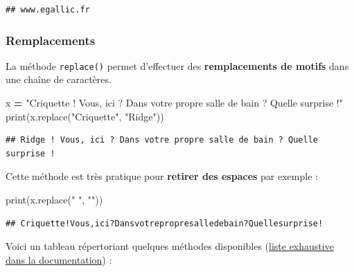 \documentclass[12pt,]{book}
\newenvironment{Shaded}{\begin{snugshade}}{\end{snugshade}}
\newcommand{\StringTok}[1]{\textcolor[rgb]{0.31,0.60,0.02}{#1}}
\newcommand{\OperatorTok}[1]{\textcolor[rgb]{0.81,0.36,0.00}{\textbf{#1}}}
\newcommand{\BuiltInTok}[1]{#1}
\newcommand{\NormalTok}[1]{#1}
\numberwithin{equation}{section}
\numberwithin{countremarque}{section}
\begin{document}
\begin{lstlisting}
## www.egallic.fr
\end{lstlisting}

\subsubsection{Remplacements}\label{remplacements}

La méthode \texttt{replace()} permet d'effectuer des
\textbf{remplacements de motifs} dans une chaîne de caractères.

\begin{Shaded}
\begin{Highlighting}[]
\NormalTok{x }\OperatorTok{=} \StringTok{"Criquette ! Vous, ici ? Dans votre propre salle de bain ? Quelle surprise !"}
\BuiltInTok{print}\NormalTok{(x.replace(}\StringTok{"Criquette"}\NormalTok{, }\StringTok{"Ridge"}\NormalTok{))}
\end{Highlighting}
\end{Shaded}

\begin{lstlisting}
## Ridge ! Vous, ici ? Dans votre propre salle de bain ? Quelle surprise !
\end{lstlisting}

Cette méthode est très pratique pour \textbf{retirer des espaces} par
exemple :

\begin{Shaded}
\begin{Highlighting}[]
\BuiltInTok{print}\NormalTok{(x.replace(}\StringTok{" "}\NormalTok{, }\StringTok{""}\NormalTok{))}
\end{Highlighting}
\end{Shaded}

\begin{lstlisting}
## Criquette!Vous,ici?Dansvotrepropresalledebain?Quellesurprise!
\end{lstlisting}

Voici un tableau répertoriant quelques méthodes disponibles
(\href{https://docs.python.org/3/library/stdtypes.html\#string-methods}{liste
exhaustive dans la documentation}) :
\end{document}

